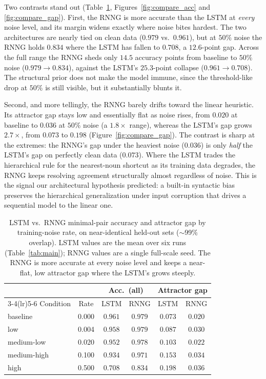 Two contrasts stand out (Table~\ref{tab:rnng_compare},
Figures~\ref{fig:compare_acc} and \ref{fig:compare_gap}). First, the RNNG is more
accurate than the LSTM at \emph{every} noise level, and its margin widens
exactly where noise bites hardest. The two architectures are nearly tied on
clean data ($0.979$ vs.\ $0.961$), but at $50\%$ noise the RNNG holds $0.834$
where the LSTM has fallen to $0.708$, a $12.6$-point gap. Across the full range
the RNNG sheds only $14.5$ accuracy points from baseline to $50\%$ noise
($0.979 \to 0.834$), against the LSTM's $25.3$-point collapse
($0.961 \to 0.708$). The structural prior does not make the model immune, since
the threshold-like drop at $50\%$ is still visible, but it substantially blunts
it.

Second, and more tellingly, the RNNG barely drifts toward the linear heuristic.
Its attractor gap stays low and essentially flat as noise rises, from $0.020$ at
baseline to $0.036$ at $50\%$ noise (a $1.8\times$ range), whereas the LSTM's gap
grows $2.7\times$, from $0.073$ to $0.198$ (Figure~\ref{fig:compare_gap}). The
contrast is sharp at the extremes: the RNNG's gap under the heaviest noise
($0.036$) is only \emph{half} the LSTM's gap on perfectly clean data ($0.073$).
Where the LSTM trades the hierarchical rule for the nearest-noun shortcut as its
training data degrades, the RNNG keeps resolving agreement structurally almost
regardless of noise. This is the signal our architectural hypothesis predicted:
a built-in syntactic bias preserves the hierarchical generalization under input
corruption that drives a sequential model to the linear one.

\begin{table}[t]
  \centering
  \small
  \begin{tabular}{lccccc}
    \toprule
    & & \multicolumn{2}{c}{Acc.\ (all)} & \multicolumn{2}{c}{Attractor gap} \\
    \cmidrule(lr){3-4}\cmidrule(lr){5-6}
    Condition & Rate & LSTM & RNNG & LSTM & RNNG \\
    \midrule
    baseline    & 0.000 & $0.961$ & $\mathbf{0.979}$ & $0.073$ & $\mathbf{0.020}$ \\
    low         & 0.004 & $0.958$ & $\mathbf{0.979}$ & $0.087$ & $\mathbf{0.030}$ \\
    medium-low  & 0.020 & $0.952$ & $\mathbf{0.978}$ & $0.103$ & $\mathbf{0.022}$ \\
    medium-high & 0.100 & $0.934$ & $\mathbf{0.971}$ & $0.153$ & $\mathbf{0.034}$ \\
    high        & 0.500 & $0.708$ & $\mathbf{0.834}$ & $0.198$ & $\mathbf{0.036}$ \\
    \bottomrule
  \end{tabular}
  \caption{LSTM vs.\ RNNG minimal-pair accuracy and attractor gap by
    training-noise rate, on near-identical held-out sets ($\sim$99\% overlap).
    LSTM values are the mean over
    six runs (Table~\ref{tab:main}); RNNG values are a single full-scale seed.
    The RNNG is more accurate at every noise level and keeps a near-flat,
    low attractor gap where the LSTM's grows steeply.}
  \label{tab:rnng_compare}
\end{table}

